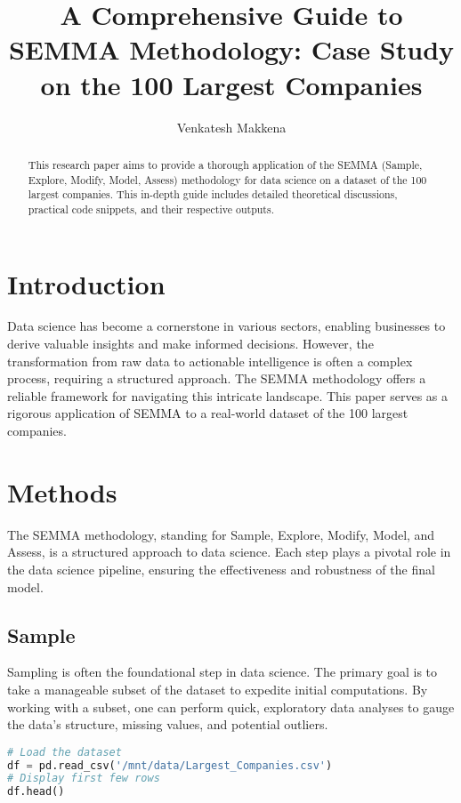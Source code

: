 \documentclass[12pt]{article}
\title{A Comprehensive Guide to SEMMA Methodology: Case Study on the 100 Largest Companies}
\author{Venkatesh Makkena}
\date{}
\begin{document}
\maketitle

\tableofcontents

\newpage

\begin{abstract}
This research paper aims to provide a thorough application of the SEMMA (Sample, Explore, Modify, Model, Assess) methodology for data science on a dataset of the 100 largest companies. This in-depth guide includes detailed theoretical discussions, practical code snippets, and their respective outputs.
\end{abstract}

\section{Introduction}

Data science has become a cornerstone in various sectors, enabling businesses to derive valuable insights and make informed decisions. However, the transformation from raw data to actionable intelligence is often a complex process, requiring a structured approach. The SEMMA methodology offers a reliable framework for navigating this intricate landscape. This paper serves as a rigorous application of SEMMA to a real-world dataset of the 100 largest companies.

\section{Methods}

The SEMMA methodology, standing for Sample, Explore, Modify, Model, and Assess, is a structured approach to data science. Each step plays a pivotal role in the data science pipeline, ensuring the effectiveness and robustness of the final model.

\subsection{Sample}

Sampling is often the foundational step in data science. The primary goal is to take a manageable subset of the dataset to expedite initial computations. By working with a subset, one can perform quick, exploratory data analyses to gauge the data's structure, missing values, and potential outliers.

\begin{lstlisting}[language=Python]
# Load the dataset
df = pd.read_csv('/mnt/data/Largest_Companies.csv')
# Display first few rows
df.head()
\end{lstlisting}
\end{document}
